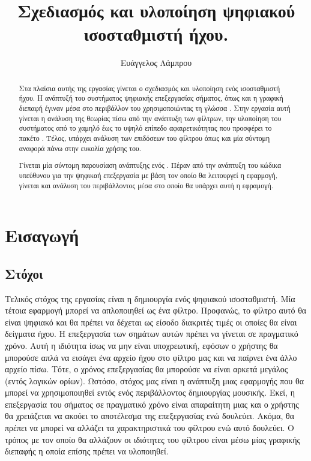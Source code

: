 \documentclass[12pt]{extarticle}
\begin{document}
\begin{titlepage}

\title{Σχεδιασμός και υλοποίηση ψηφιακού ισοσταθμιστή ήχου.}

\author{Ευάγγελος Λάμπρου}
\date{}

\maketitle


\begin{abstract}
    Στα πλαίσια αυτής της εργασίας γίνεται ο σχεδιασμός και υλοποίηση 
    ενός ισοσταθμιστή ήχου. 
    Η ανάπτυξή του συστήματος ψηφιακής επεξεργασίας σήματος, όπως 
    και η γραφική διεπαφή έγιναν μέσα στο περιβάλλον του 
     χρησιμοποιώντας τη γλώσσα . 
    Στην εργασία αυτή γίνεται η ανάλυση της θεωρίας πίσω από την ανάπτυξη των φίλτρων, 
    την υλοποίηση του συστήματος από το χαμηλό έως το υψηλό επίπεδο αφαιρετικότητας που 
    προσφέρει το πακέτο . 
    Τέλος, υπάρχει ανάλυση των επιδόσεων του φίλτρου όπως και μία σύντομη αναφορά πάνω 
    στην ευκολία χρήσης του.

    Γίνεται μία σύντομη παρουσίαση ανάπτυξης ενός . Πέραν από
    την ανάπτυξη του κώδικα υπεύθυνου για την ψηφικαή επεξεργασία με βάση τον
    οποίο θα λειτουργεί η εφαρμογή, γίνεται και ανάλυση του περιβάλλοντος μέσα
    στο οποίο θα υπάρχει αυτή η εφραμογή.

\end{abstract}


\end{titlepage}


\section{Εισαγωγή}

\subsection{Στόχοι} 
Τελικός στόχος της εργασίας είναι η δημιουργία ενός ψηφιακού ισοσταθμιστή. 
Μία τέτοια εφαρμογή μπορεί να απλοποιηθεί ως ένα φίλτρο. Προφανώς, 
το φίλτρο αυτό θα είναι ψηφιακό και θα πρέπει να δέχεται ως είσοδο διακριτές 
τιμές οι οποίες θα είναι δείγματα ήχου. 
Η επεξεργασία των σημάτων αυτών πρέπει να γίνεται σε πραγματικό χρόνο. 
Αυτή η ιδιότητα ίσως να μην είναι υποχρεωτική, εφόσων ο χρήστης 
θα μπορούσε απλά να εισάγει ένα αρχείο ήχου στο φίλτρο μας και να παίρνει ένα 
άλλο αρχείο πίσω. Τότε, ο χρόνος επεξεργασίας θα μπορούσε να είναι αρκετά 
μεγάλος (εντός λογικών ορίων). 
Ωστόσο, στόχος μας είναι η ανάπτυξη μιας εφαρμογής που θα μπορεί να χρησιμοποιηθεί 
εντός ενός περιβάλλοντος δημιουργίας μουσικής. Εκεί, η επεξεργασία του σήματος σε πραγματικό 
χρόνο είναι απαραίτητη μιας και ο χρήστης θα χρειάζεται να ακούει το αποτέλεσμα της επεξεργασίας 
ενώ δουλεύει. Ακόμα, θα πρέπει να μπορεί να αλλάζει τα χαρακτηριστικά του φίλτρου ενώ αυτό δουλεύει.
Ο τρόπος με τον οποίο θα αλλάζουν οι ιδιότητες του φίλτρου είναι μέσω μίας γραφικής διεπαφής η οποία 
επίσης πρέπει να υλοποιηθεί.
\end{document}
